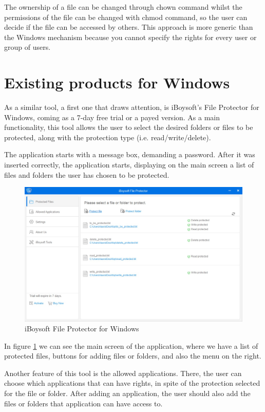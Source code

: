 	The ownership of a file can be changed through chown command whilst the permissions of the file can be changed with chmod command, so the user can decide if the file can be accessed by others. This approach is more generic than the Windows mechanism because you cannot specify the rights for every user or group of users.
	
		
	\section{Existing products for Windows}
	As a similar tool, a first one that draws attention, is iBoysoft's File Protector for Windows, coming as a 7-day free trial or a payed version. As a main functionality, this tool allows the user to select the desired folders or files to be protected, along with the protection type (i.e. read/write/delete).
	
	The application starts with a message box, demanding a password. After it was inserted correctly, the application starts, displaying on the main screen a list of files and folders the user has chosen to be protected.
	
	\begin{figure}[h!]
		\includegraphics[width=\linewidth]{images/iBoysoftMain.jpg}
		\caption{iBoysoft File Protector for Windows}
		\label{fig:iBoysoftFP}
	\end{figure}
	
	In figure \ref{fig:iBoysoftFP} we can see the main screen of the application, where we have a list of protected files, buttons for adding files or folders, and also the menu on the right. 
	
	Another feature of this tool is the allowed applications. There, the user can choose which applications that can have rights, in spite of the protection selected for the file or folder. After adding an application, the user should also add the files or folders that application can have access to.
	
